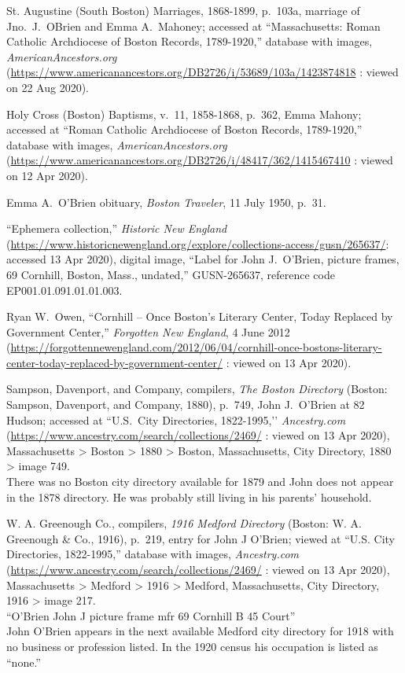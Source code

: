 \begin{thebibliography}{999}
	St. Augustine (South Boston) Marriages, 1868-1899, p.\ 103a, marriage of Jno.\ J.\ OBrien and Emma A.\ Mahoney; accessed at ``Massachusetts: Roman Catholic Archdiocese of Boston Records, 1789-1920,'' database with images, \textit{AmericanAncestors.org} (\url{https://www.americanancestors.org/DB2726/i/53689/103a/1423874818} : viewed on 22 Aug 2020).
	
	Holy Cross (Boston) Baptisms, v.\ 11, 1858-1868, p.\ 362, Emma Mahony; accessed at ``Roman Catholic Archdiocese of Boston Records, 1789-1920,'' database with images, \textit{AmericanAncestors.org} (\url{https://www.americanancestors.org/DB2726/i/48417/362/1415467410} : viewed on 12 Apr 2020).
	
	Emma A.\ O'Brien obituary, \textit{Boston Traveler}, 11 July 1950, p.\ 31.
	
	``Ephemera collection,'' \textit{Historic New England} (\url{https://www.historicnewengland.org/explore/collections-access/gusn/265637/}: accessed 13 Apr 2020), digital image, ``Label for John J.\ O'Brien, picture frames, 69 Cornhill, Boston, Mass., undated,'' GUSN-265637, reference code EP001.01.091.01.01.003.
	
	Ryan W.\ Owen, ``Cornhill -- Once Boston’s Literary Center, Today Replaced by Government Center,'' \textit{Forgotten New England}, 4 June 2012 (\url{https://forgottennewengland.com/2012/06/04/cornhill-once-bostons-literary-center-today-replaced-by-government-center/} : viewed on 13 Apr 2020).
	
	Sampson, Davenport, and Company, compilers, \textit{The Boston Directory} (Boston: Sampson, Davenport, and Company, 1880), p.\ 749, John J.\ O'Brien at 82 Hudson; accessed at ``U.S.\ City Directories, 1822-1995,’’ \textit{Ancestry.com} (\url{https://www.ancestry.com/search/collections/2469/} : viewed on 13 Apr 2020), Massachusetts > Boston > 1880 > Boston, Massachusetts, City Directory, 1880 > image 749.\\
	There was no Boston city directory available for 1879 and John does not appear in the 1878 directory. He was probably still living in his parents' household.
	
	W. A. Greenough Co., compilers, \textit{1916 Medford Directory} (Boston: W. A. Greenough \& Co., 1916), p.\ 219, entry for John J O'Brien; viewed at ``U.S. City Directories, 1822-1995,'' database with images, \textit{Ancestry.com} (\url{https://www.ancestry.com/search/collections/2469/} : viewed on 13 Apr 2020), Massachusetts > Medford > 1916 > Medford, Massachusetts, City Directory, 1916 > image 217.\\
	``O'Brien John J picture frame mfr 69 Cornhill B 45 Court''\\
	John O'Brien appears in the next available Medford city directory for 1918 with no business or profession listed. In the 1920 census his occupation is listed as ``none.''
	

\end{thebibliography}
